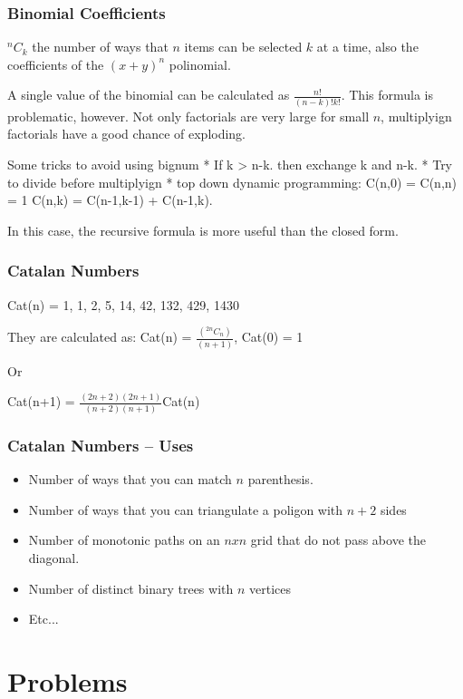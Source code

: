\documentclass{beamer}
\begin{document}
\begin{frame}
  \frametitle{Binomial Coefficients}
  {\smaller
  $^nC_k$ the number of ways that $n$ items can be selected $k$ at a time, also the coefficients of 
  the $(x+y)^n$ polinomial.

  A single value of the binomial can be calculated as
  $\frac{n!}{(n-k)!k!}$. This formula is problematic, however. Not
  only factorials are very large for small $n$, multiplyign factorials
  have a good chance of exploding.

  Some tricks to avoid using bignum
  * If k > n-k. then exchange k and n-k.
  * Try to divide before multiplyign
  * top down dynamic programming: C(n,0) = C(n,n) = 1
  C(n,k) = C(n-1,k-1) + C(n-1,k). 

  In this case, the recursive formula is more useful than the closed form.
  }
\end{frame}

\begin{frame}
  \frametitle{Catalan Numbers}

  Cat(n) = 1, 1, 2, 5, 14, 42, 132, 429, 1430

  They are calculated as: 
  Cat(n) = $\frac{(^{2n}C_n)}{(n+1)}$, Cat(0) = 1

  Or

  Cat(n+1) = $\frac{(2n+2)(2n+1)}{(n+2)(n+1)}$Cat(n)

\end{frame}

\begin{frame}
  \frametitle{Catalan Numbers -- Uses}
  \begin{itemize}
    \item Number of ways that you can match $n$ parenthesis.
    \item Number of ways that you can triangulate a poligon with $n+2$ sides
    \item Number of monotonic paths on an $nxn$ grid that do not pass above
      the diagonal.
    \item Number of distinct binary trees with $n$ vertices
    \item Etc...
  \end{itemize}
\end{frame}

\section{Problems}
\end{document}
